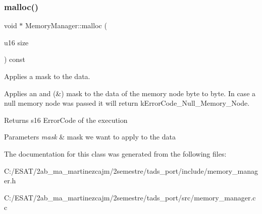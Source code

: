 \subsubsection{\texorpdfstring{malloc()}{malloc()}}
{\footnotesize\ttfamily void $\ast$ Memory\+Manager\+::malloc (\begin{DoxyParamCaption}\item[{u16}]{size }\end{DoxyParamCaption}) const}



Applies a mask to the data. 

Applies an and (\&) mask to the data of the memory node byte to byte. In case a null memory node was passed it will return k\+Error\+Code\+\_\+\+Null\+\_\+\+Memory\+\_\+\+Node. \begin{DoxyReturn}{Returns}
s16 Error\+Code of the execution 
\end{DoxyReturn}

\begin{DoxyParams}{Parameters}
{\em mask} & mask we want to apply to the data \\
\hline
\end{DoxyParams}


The documentation for this class was generated from the following files\+:\begin{DoxyCompactItemize}
\item 
C\+:/\+E\+S\+A\+T/2ab\+\_\+ma\+\_\+martinezcajm/2semestre/tads\+\_\+port/include/memory\+\_\+manager.\+h\item 
C\+:/\+E\+S\+A\+T/2ab\+\_\+ma\+\_\+martinezcajm/2semestre/tads\+\_\+port/src/memory\+\_\+manager.\+cc\end{DoxyCompactItemize}

